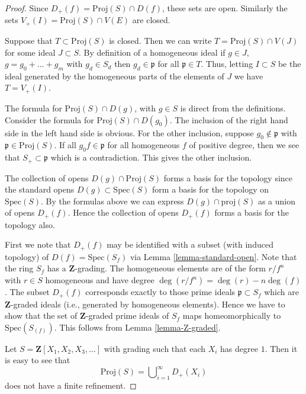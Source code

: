 \begin{proof}
Since $D_{+}(f) = \text{Proj}(S) \cap D(f)$, these sets are open.
Similarly the sets $V_{+}(I) = \text{Proj}(S) \cap V(E)$ are
closed.

\medskip\noindent
Suppose that $T \subset \text{Proj}(S)$ is closed.
Then we can write $T = \text{Proj}(S) \cap V(J)$ for some
ideal $J \subset S$. By definition of a homogeneous ideal
if $g \in J$, $g = g_0 + \ldots + g_m$
with $g_d \in S_d$ then $g_d \in \mathfrak p$ for all
$\mathfrak p \in T$. Thus, letting $I \subset S$
be the ideal generated by the homogeneous parts of the elements
of $J$ we have $T = V_{+}(I)$.

\medskip\noindent
The formula for $\text{Proj}(S) \cap D(g)$, with $g \in S$ is direct
from the definitions. Consider the formula for $\text{Proj}(S) \cap D(g_0)$.
The inclusion of the right hand side in the left hand side is
obvious. For the other inclusion, suppose $g_0 \not \in \mathfrak p$
with $\mathfrak p \in \text{Proj}(S)$. If all $g_0f \in \mathfrak p$
for all homogeneous $f$ of positive degree, then we see that
$S_{+} \subset \mathfrak p$ which is a contradiction. This gives
the other inclusion.

\medskip\noindent
The collection of opens $D(g) \cap \text{Proj}(S)$
forms a basis for the topology since the standard opens
$D(g) \subset \text{Spec}(S)$ form a basis for the topology on
$\text{Spec}(S)$. By the formulas above we can express
$D(g) \cap \text{proj}(S)$ as a union of opens $D_{+}(f)$.
Hence the collection of opens $D_{+}(f)$ forms a basis for the topology
also.

\medskip\noindent
First we note that $D_{+}(f)$ may be identified
with a subset (with induced topology) of $D(f) = \text{Spec}(S_f)$
via Lemma \ref{lemma-standard-open}. Note that the ring
$S_f$ has a $\mathbf{Z}$-grading. The homogeneous elements are
of the form $r/f^n$ with $r \in S$ homogeneous and have
degree $\deg(r/f^n) = \deg(r) - n\deg(f)$. The subset
$D_{+}(f)$ corresponds exactly to those prime ideals
$\mathfrak p \subset S_f$ which are $\mathbf{Z}$-graded ideals
(i.e., generated by homogeneous elements). Hence we have to show that
the set of $\mathbf{Z}$-graded prime ideals of $S_f$ maps homeomorphically
to $\text{Spec}(S_{(f)})$. This follows from Lemma \ref{lemma-Z-graded}.

\medskip\noindent
Let $S = \mathbf{Z}[X_1, X_2, X_3, \ldots]$ with grading such that
each $X_i$ has degree $1$. Then it is easy to see that
$$
\text{Proj}(S) = \bigcup\nolimits_{i = 1}^\infty D_{+}(X_i)
$$
does not have a finite refinement.


\end{proof}
